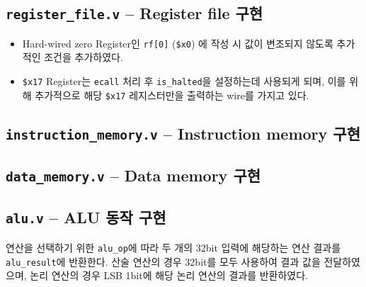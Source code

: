 \documentclass{scrartcl}
\begin{document}
\subsection{\texttt{register\_file.v} -- Register file 구현}
\begin{itemize}
    \item Hard-wired zero Register인 \texttt{rf[0]} (\texttt{\$x0}) 에 작성 시 값이 변조되지 않도록
    추가적인 조건을 추가하였다.
    \item \texttt{\$x17} Register는 \texttt{ecall} 처리 후 \texttt{is\_halted}을 설정하는데
    사용되게 되며, 이를 위해 추가적으로 해당 \texttt{\$x17} 레지스터만을 출력하는 wire를 가지고 있다. 
\end{itemize}
\subsection{\texttt{instruction\_memory.v} -- Instruction memory 구현}

\subsection{\texttt{data\_memory.v} -- Data memory 구현}

\subsection{\texttt{alu.v} -- ALU 동작 구현}
연산을 선택하기 위한 \texttt{alu\_op}에 따라 두 개의 32bit 입력에 해당하는 연산 결과를 \texttt{alu\_result}에 반환한다.
산술 연산의 경우 32bit를 모두 사용하여 결과 값을 전달하였으며, 논리 연산의 경우 LSB 1bit에 해당 논리 연산의 결과를 반환하였다.
\end{document}
